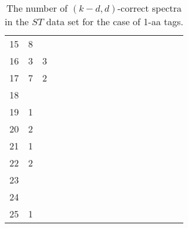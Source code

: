 \documentclass{article}
\begin{document}
\begin{landscape}
\begin{table}[h]
{\begin{tabular}{|c|c|
c|c|c|c|c|c|c|c|c|c|c|c|c|c|c|}
15  & 8 &  &  &  &  &  &  &  &  &  &  &  &  &  &  & \\

16  & 3 & 3 &  &  &  &  &  &  &  &  &  &  &  &  &  & \\

17  & 7 & 2 &  &  &  &  &  &  &  &  &  &  &  &  &  & \\

18  &  &  &  &  &  &  &  &  &  &  &  &  &  &  &  & \\

19  & 1 &  &  &  &  &  &  &  &  &  &  &  &  &  &  & \\

20  & 2 &  &  &  &  &  &  &  &  &  &  &  &  &  &  & \\

21  & 1 &  &  &  &  &  &  &  &  &  &  &  &  &  &  & \\

22  & 2 &  &  &  &  &  &  &  &  &  &  &  &  &  &  & \\

23  &  &  &  &  &  &  &  &  &  &  &  &  &  &  &  & \\

24  &  &  &  &  &  &  &  &  &  &  &  &  &  &  &  & \\

25  & 1 &  &  &  &  &  &  &  &  &  &  &  &  &  &  & \\

  \hline
\end{tabular}
\par}
\centering
\caption{The number of $(k-d,d)$-correct spectra in the $ST$ data set for the case of 1-aa tags.}
\vspace{3mm}
\label{table:kd-1-ST}
\end{table}
\end{landscape}
\end{document}
